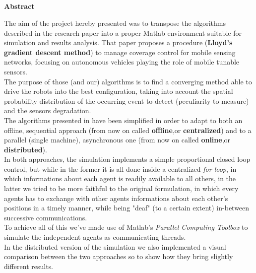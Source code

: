 \documentclass[a4paper,11pt,oneside]{book}
\begin{document}
	
	\newpage
	\thispagestyle{empty}
	
	
	
	\begin{center}
		\chapter*{}
		\thispagestyle{empty}
		{\Huge \textbf{Abstract}}\\
		\vspace{15mm}
	\end{center}
		The aim of the project hereby presented was to transpose the algorithms described in the research paper\cite{K1} into a proper Matlab environment suitable for simulation and results analysis. That paper proposes a procedure (\textbf{Lloyd's gradient descent method}) to manage coverage control for mobile sensing networks, focusing on autonomous vehicles playing the role of mobile tunable sensors.\\ 
	The purpose of those (and our) algorithms is to find a converging method able to drive the robots into the best configuration, taking into account the spatial probability distribution of the occurring event to detect (peculiarity to measure) and the sensors degradation.\\
	The algorithms presented in \cite{K1} have been simplified in order to adapt to both an offline, sequential approach (from now on called \textbf{offline},or \textbf{centralized}) and to a parallel (single machine), asynchronous one (from now on called \textbf{online},or \textbf{distributed}).\\
	In both approaches, the simulation implements a simple proportional closed loop control, but while in the former it is all done inside a centralized \textit{for loop}, in which informations about each agent is readily available to all others, in the latter we tried to be more faithful to the original formulation, in which every agents has to exchange with other agents informations about each other's positions in a timely manner, while being "deaf" (to a certain extent) in-between successive communications.\\
	To achieve all of this we've made use of Matlab's \textit{Parallel Computing Toolbox} to simulate the independent agents as communicating threads.\\
	In the distributed version of the simulation we also implemented a visual comparison between the two approaches so to show how they bring slightly different results.
	
\end{document}

